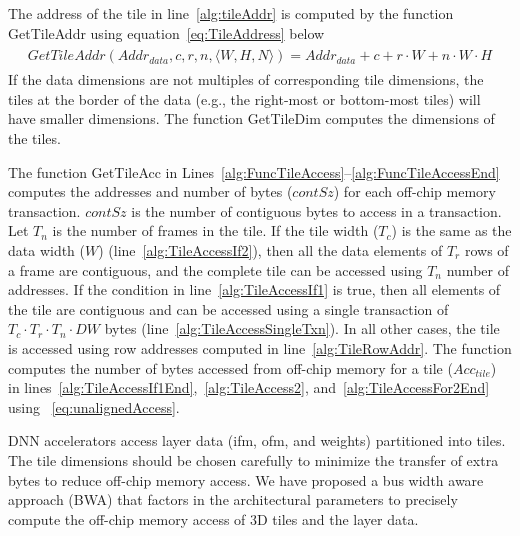 The address of the tile in line~\ref{alg:tileAddr} is computed by the function GetTileAddr using equation~\ref{eq:TileAddress} below
\begin{align}\label{eq:TileAddress}
	\begin{split}
		GetTileAddr(Addr_{data},c,r,n,\langle W,H,N\rangle){=}Addr_{data} + c + r\cdot W + n\cdot W\cdot H
	\end{split}
\end{align}
If the data dimensions are not multiples of corresponding tile dimensions, the tiles at the border of the data (e.g., the right-most or bottom-most tiles) will have smaller dimensions. The function GetTileDim computes the dimensions of the tiles.

The function GetTileAcc in Lines~\ref{alg:FuncTileAccess}--\ref{alg:FuncTileAccessEnd} computes the addresses and number of bytes ($contSz$) for each off-chip memory transaction. $contSz$ is the number of contiguous bytes to access in a transaction. Let $T_n$ is the number of frames in the tile. If the tile width ($T_c$) is the same as the data width ($W$) (line~\ref{alg:TileAccessIf2}), then all the data elements of $T_r$ rows of a frame are contiguous, and the complete tile can be accessed using $T_n$ number of addresses. If the condition in line~\ref{alg:TileAccessIf1} is true, then all elements of the tile are contiguous and can be accessed using a single transaction of $T_c\cdot T_r\cdot T_n\cdot DW$ bytes (line~\ref{alg:TileAccessSingleTxn}). In all other cases, the tile is accessed using row addresses computed in line~\ref{alg:TileRowAddr}. The function computes the number of bytes accessed from off-chip memory for a tile ($Acc_{tile}$) in lines~\ref{alg:TileAccessIf1End},~\ref{alg:TileAccess2}, and~\ref{alg:TileAccessFor2End} using ~\eqref{eq:unalignedAccess}. 

DNN accelerators access layer data (ifm, ofm, and weights) partitioned into tiles. The tile dimensions should be chosen carefully to minimize the transfer of extra bytes to reduce off-chip memory access. We have proposed a bus width aware approach (BWA) that factors in the architectural parameters to precisely compute the off-chip memory access of 3D tiles and the layer data.

